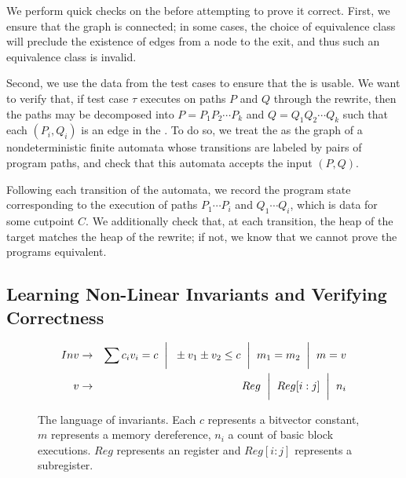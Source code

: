 We perform quick checks on the \bisimrep{} before attempting to prove
it correct. First, we ensure that the graph is connected; in some
cases, the choice of equivalence class will preclude the existence of
edges from a node to the exit, and thus such an equivalence class is
invalid.

Second, we use the data from the test cases to ensure that the
\bisimrep{} is usable. We want to verify that, if test case $\tau$
executes on paths $P$ and $Q$ through the rewrite, then the paths
may be decomposed into $P = P_1P_2\dotsm P_k$ and $Q = Q_1Q_2\dotsm
Q_k$ such that each $(P_i, Q_i)$ is an edge in the \bisimrep. To do
so, we treat the \bisimrep as the graph of a nondeterministic finite
automata whose transitions are labeled by pairs of program paths, and
check that this automata accepts the input $(P, Q)$. 

Following each transition of the automata, we record the program state
corresponding to the execution of paths $P_1\dotsm P_i$ and $Q_1
\dotsm Q_i$, which is data for some cutpoint $C$. We additionally
check that, at each transition, the heap of the target matches the
heap of the rewrite; if not, we know that we cannot prove the programs
equivalent.

\subsection{Learning Non-Linear Invariants and Verifying Correctness} \label{algstep6}

\begin{figure}
\begin{eqnarray*}
Inv &\rightarrow& \sum c_iv_i = c \hspace{2mm}\bigg|\hspace{2mm} \pm v_1 \pm v_2 \leq c \hspace{2mm}\bigg|\hspace{2mm} m_1 = m_2 \hspace{2mm}\bigg|\hspace{2mm} m = v\\
v   &\rightarrow& Reg \hspace{2mm}\bigg|\hspace{2mm}  Reg[i:j]  \hspace{2mm}\bigg|\hspace{2mm} n_i\\
\end{eqnarray*}
\caption{The language of invariants.  Each $c$ represents a bitvector constant, $m$ represents a memory dereference, $n_i$ a count of basic block executions.  $Reg$ represents an \arch{} register and $Reg[i:j]$ represents a subregister.}
\end{figure}

